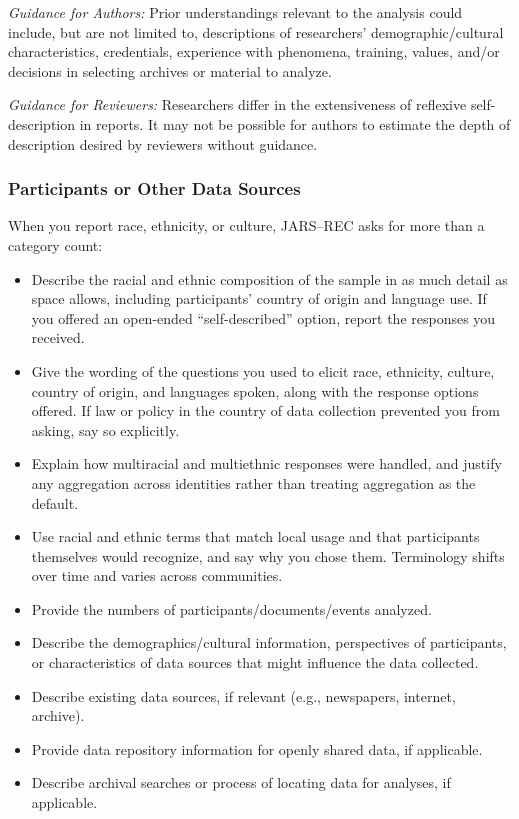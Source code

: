 \documentclass[acmsmall,screen,anonymous,review]{acmart}
\begin{document}
\textit{Guidance for Authors:} Prior understandings relevant to the analysis could include, but are not limited to, descriptions of researchers’ demographic/cultural characteristics, credentials, experience with phenomena, training, values, and/or decisions in selecting archives or material to
analyze.

\textit{Guidance for Reviewers:} Researchers differ in the extensiveness of reflexive self-description in reports. It may not be possible for authors to estimate the depth of description desired by reviewers
without guidance.

\subsubsection{Participants or Other Data Sources}


When you report race, ethnicity, or culture, JARS--REC asks for more than a category count:
\begin{itemize}
    \item Describe the racial and ethnic composition of the sample in as much detail as space allows, including participants' country of origin and language use. If you offered an open-ended ``self-described'' option, report the responses you received.
    \item Give the wording of the questions you used to elicit race, ethnicity, culture, country of origin, and languages spoken, along with the response options offered. If law or policy in the country of data collection prevented you from asking, say so explicitly.
    \item Explain how multiracial and multiethnic responses were handled, and justify any aggregation across identities rather than treating aggregation as the default.
    \item Use racial and ethnic terms that match local usage and that participants themselves would recognize, and say why you chose them. Terminology shifts over time and varies across communities.
\end{itemize}

\begin{itemize}
    \item Provide the numbers of participants/documents/events analyzed.
\item  Describe the demographics/cultural information, perspectives of participants, or
characteristics of data sources that might influence the data collected.
\item  Describe existing data sources, if relevant (e.g., newspapers, internet, archive).
\item  Provide data repository information for openly shared data, if applicable.
\item  Describe archival searches or process of locating data for analyses, if applicable.
\end{itemize}
\end{document}
